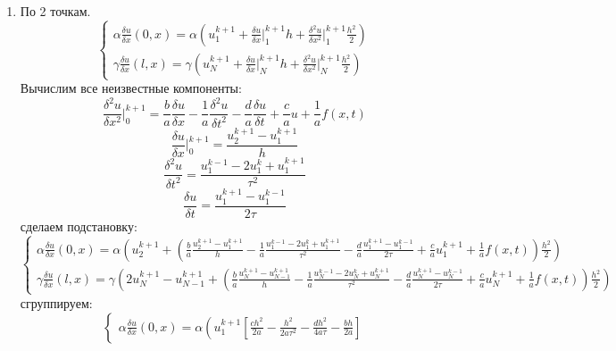\documentclass[12pt]{article}
\begin{document}
\begin{enumerate}
\begin{enumerate}
        \item По 2 точкам.
        \begin{equation*}
            \begin{cases}
                \alpha\frac{\delta u}{\delta x}(0,x) = \alpha\left( u_1^{k+1} + \frac{\delta u}{\delta x}\bigg|_{1}^{k+1}h+\frac{\delta^2 u}{\delta x^2}\bigg|_{1}^{k+1}\frac{h^2}{2}\right)
                \\
                \gamma\frac{\delta u}{\delta x}(l,x) = \gamma\left( u_N^{k+1} + \frac{\delta u}{\delta x}\bigg|_{N}^{k+1}h+\frac{\delta^2 u}{\delta x^2}\bigg|_{N}^{k+1}\frac{h^2}{2}\right)
            \end{cases}
        \end{equation*}
        Вычислим все неизвестные компоненты:\\
        $$\frac{\delta^2 u}{\delta x^2}\bigg|_{0}^{k+1} =\frac{b}{a}\frac{\delta u}{\delta x}-\frac{1}{a}\frac{\delta^2 u}{\delta t^2}- \frac{d}{a}\frac{\delta u}{\delta t}+\frac{c}{a}u+\frac{1}{a}f(x,t)$$
        $$\frac{\delta u}{\delta x}\bigg|_{0}^{k+1} = \frac{u_{2}^{k+1}-u_{1}^{k+1}}{h}$$
        $$\frac{\delta^2 u}{\delta t^2} = \frac{u_{1}^{k-1}-2u_{1}^k+u_{1}^{k+1}}{\tau^2}$$
        $$\frac{\delta u}{\delta t}=\frac{u_1^{k+1}-u_1^{k-1}}{2\tau}$$
        сделаем подстановку:
        \begin{equation*}
            \begin{cases}
                \alpha\frac{\delta u}{\delta x}(0,x) = \alpha\left(u_{2}^{k+1}+\left(\frac{b}{a}\frac{u_{2}^{k+1}-u_{1}^{k+1}}{h}-
                \frac{1}{a}\frac{u_{1}^{k-1}-2u_{1}^k+u_{1}^{k+1}}{\tau^2}- \frac{d}{a}\frac{u_1^{k+1}-u_1^{k-1}}{2\tau}+\frac{c}{a}u_1^{k+1}+
                \frac{1}{a}f(x,t)\right)\frac{h^2}{2}\right)
                \\
                \gamma\frac{\delta u}{\delta x}(l,x) = \gamma\left( 2u_N^{k+1} -u_{N-1}^{k+1}+\left(\frac{b}{a}\frac{u_{N}^{k+1}-
                u_{N-1}^{k+1}}{h}-\frac{1}{a}\frac{u_{N}^{k-1}-2u_{N}^k+u_{N}^{k+1}}{\tau^2}- \frac{d}{a}\frac{u_N^{k+1}-u_N^{k-1}}{2\tau}+\frac{c}{a}u_N^{k+1}
                +\frac{1}{a}f(x,t) \right)\frac{h^2}{2}\right)
            \end{cases}
        \end{equation*}
        сгруппируем:
        \begin{equation*}
            \begin{cases}
                \alpha\frac{\delta u}{\delta x}(0,x) = \alpha\left( u_1^{k+1}\left[ \frac{ch^2}{2a}-\frac{h^2}{2a\tau^2}-\frac{dh^2}{4a\tau}-\frac{bh}{2a} \right]

\end{cases}
\end{equation*}
\end{enumerate}
\end{enumerate}
\end{document}
